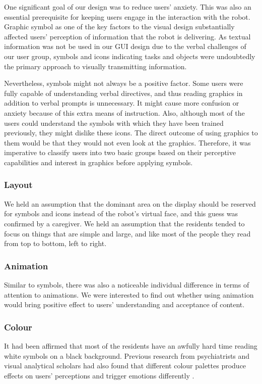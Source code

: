 \documentclass[letterpaper, 10 pt, conference]{ieeeconf}  %
\begin{document}
One significant goal of our design was to reduce users' anxiety. This was also an essential prerequisite for keeping users engage in the interaction with the robot. Graphic symbol as one of the key factors to the visual design substantially affected users' perception of information that the robot is delivering. As textual information was not be used in our GUI design due to the verbal challenges of our user group, symbols and icons indicating tasks and objects were undoubtedly the primary approach to visually transmitting information.

Nevertheless, symbols might not always be a positive factor. Some users were fully capable of understanding verbal directives, and thus reading graphics in addition to verbal prompts is unnecessary. It might cause more confusion or anxiety because of this extra means of instruction. Also, although most of the users could understand the symbols with which they have been trained previously, they might dislike these icons. The direct outcome of using graphics to them would be that they would not even look at the graphics. Therefore, it was imperative to classify users into two basic groups based on their perceptive capabilities and interest in graphics before applying symbols.

\subsubsection{Layout}

We held an assumption that the dominant area on the display should be reserved for symbols and icons instead of the robot's virtual face, and this guess was confirmed by a caregiver. We held an assumption that the residents tended to focus on things that are simple and large, and like most of the people they read from top to bottom, left to right. 

\subsubsection{Animation}
Similar to symbols, there was also a noticeable individual difference in terms of attention to animations. We were interested to find out whether using animation would bring positive effect to users' understanding and acceptance of content.

\subsubsection{Colour}
It had been affirmed that most of the residents have an awfully hard time reading white symbols on a black background. Previous research from psychiatrists and visual analytical scholars had also found that different colour palettes produce effects on users' perceptions and trigger emotions differently \cite{Song:2017fj}.
\end{document}
